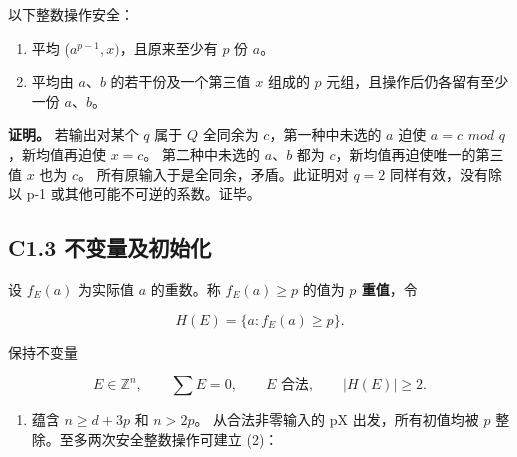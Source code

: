 \documentclass[11pt,a4paper]{article}
\newcommand{\tightlist}{\setlength{\itemsep}{0pt}\setlength{\parskip}{0pt}}
\theoremstyle{definition}
\numberwithin{equation}{section}
\begin{document}
{以下整数操作安全：}

\begin{enumerate}
\def\labelenumi{\arabic{enumi}.}
\tightlist
\item
  {平均} {(\ensuremath{a^{p-1},x)}，且原来至少有} {\ensuremath{p}} {份} {\ensuremath{a}。}
\item
  {平均由} {\ensuremath{a}、\ensuremath{b}} {的若干份及一个第三值} {\ensuremath{x}} {组成的} {\ensuremath{p}} {元组，且操作后仍各留有至少一份} {\ensuremath{a}、\ensuremath{b}。}
\end{enumerate}

\textbf{{证明。}} {若输出对某个} {\ensuremath{q}} {属于} {\ensuremath{Q}} {全同余为} {\ensuremath{c}，第一种中未选的} {\ensuremath{a}} {迫使} {\ensuremath{a=c}} {\ensuremath{mod}} {\ensuremath{q}，新均值再迫使} {\ensuremath{x=c}。} {第二种中未选的} {\ensuremath{a}、\ensuremath{b}} {都为} {\ensuremath{c}，新均值再迫使唯一的第三值} {\ensuremath{x}} {也为} {\ensuremath{c}。} {所有原输入于是全同余，矛盾。此证明对} {\ensuremath{q=2}} {同样有效，没有除以} {p-1} {或其他可能不可逆的系数。证毕。}

\subsection*{\texorpdfstring{{C1.3} {不变量及初始化}}{C1.3 不变量及初始化}}\label{C1-h5}

{设} {\ensuremath{f_{E}(a)}} {为实际值} {\ensuremath{a}} {的重数。称} {\ensuremath{f_{E}(a)\ge p}} {的值为} \textbf{{\ensuremath{p}} {重值}}{，令}

\[
H(E)=\{a:f_E(a)\ge p\}.
\]

{保持不变量}

\[
E\in\mathbb Z^n,\qquad \sum E=0,\qquad E\text{ 合法},\qquad |H(E)|\ge2.
\tag{C1.2}
\]

\begin{enumerate}
\def\labelenumi{(\arabic{enumi})}
\tightlist
\item
  {蕴含} {\ensuremath{n\ge d+3p}} {和} {\ensuremath{n>2p}。} {从合法非零输入的} {pX} {出发，所有初值均被} {\ensuremath{p}} {整除。至多两次安全整数操作可建立} {(2)：}
\end{enumerate}
\end{document}
